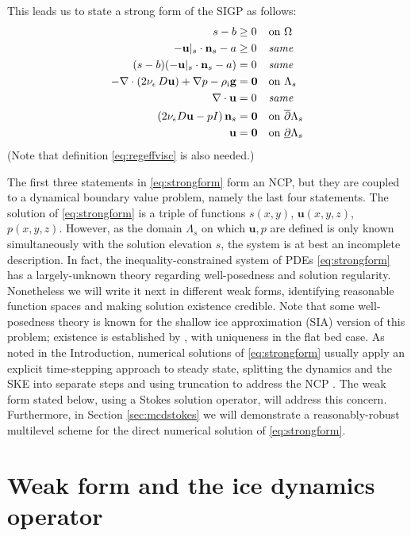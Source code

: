 \documentclass[letterpaper,final,12pt,reqno]{amsart}
\theoremstyle{claim}
\newcommand{\eps}{\epsilon}
\newcommand{\bn}{\mathbf{n}}
\newcommand{\bu}{\mathbf{u}}
\newcommand{\bzero}{\bm{0}}
\newcommand{\rhoi}{\rho_{\text{i}}}
\numberwithin{equation}{section}
\numberwithin{figure}{section}
\numberwithin{table}{section}
\numberwithin{theorem}{section}
\begin{document}
This leads us to state a strong form of the SIGP as follows:
\begin{align}
s - b &\ge 0 && \text{on $\Omega$} \label{eq:strongform} \\
- \bu|_s \cdot \bn_s - a &\ge 0 && \text{\emph{same}} \notag \\
(s - b) (- \bu|_s \cdot \bn_s - a) &= 0 && \text{\emph{same}} \notag \\
- \nabla \cdot \left(2 \nu_\eps\, D\bu\right) + \nabla p - \rhoi \mathbf{g} &= \bzero && \text{on $\Lambda_s$} \notag \\
\nabla \cdot \bu &= 0 && \text{\emph{same}} \notag \\
\left(2 \nu_\eps D\bu - pI\right) \bn_s &= \bzero && \text{on $\overline{\partial} \Lambda_s$} \notag \\
\bu &= \bzero && \text{on $\underline{\partial} \Lambda_s$} \notag
\end{align}
(Note that definition \eqref{eq:regeffvisc} is also needed.)

The first three statements in \eqref{eq:strongform} form an NCP, but they are coupled to a dynamical boundary value problem, namely the last four statements.  The solution of \eqref{eq:strongform} is a triple of functions $s(x,y)$, $\bu(x,y,z)$, $p(x,y,z)$.  However, as the domain $\Lambda_s$ on which $\bu,p$ are defined is only known simultaneously with the solution elevation $s$, the system is at best an incomplete description.  In fact, the inequality-constrained system of PDEs \eqref{eq:strongform} has a largely-unknown theory regarding well-posedness and solution regularity.  Nonetheless we will write it next in different weak forms, identifying reasonable function spaces and making solution existence credible.  Note that some well-posedness theory is known for the shallow ice approximation (SIA) version of this problem; existence is established by \cite{JouvetBueler2012}, with uniqueness in the flat bed case.  As noted in the Introduction, numerical solutions of \eqref{eq:strongform} usually apply an explicit time-stepping approach to steady state, splitting the dynamics and the SKE into separate steps and using truncation to address the NCP \cite[for example]{Jouvetetal2008,Lengetal2012}.  The weak form stated below, using a Stokes solution operator, will address this concern.  Furthermore, in Section \ref{sec:mcdstokes} we will demonstrate a reasonably-robust multilevel scheme for the direct numerical solution of \eqref{eq:strongform}.


\section{Weak form and the ice dynamics operator} \label{sec:weakido}
\end{document}
